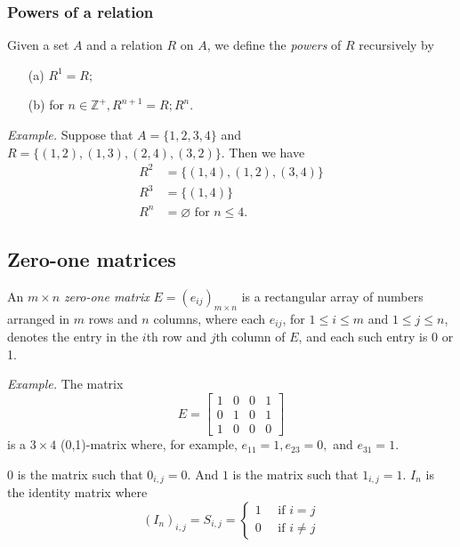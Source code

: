 \documentclass[11pt]{article}
\let\emptyset\varnothing
\begin{document}
    \subsubsection{Powers of a relation}

    Given a set $A$ and a relation $R$ on $A$, we define the \emph{powers} of $R$ recursively by 
    \begin{enumerate}
        \item[(a)] \(R^1 = R;\)
        \item[(b)] for \(n \in \mathbb{Z}^+, R^{n+1} = R;R^n.\)  
    \end{enumerate}

    \emph{Example.} Suppose that \(A = \{1,2,3,4\}\) and \(R = \{(1,2),(1,3),(2,4),(3,2)\}\). Then we have
    \begin{align*}
        R^2 &= \{(1,4),(1,2),(3,4)\} \\
        R^3 &= \{(1,4)\} \\
        R^n &= \emptyset \text{ for } n \leq 4.
    \end{align*}

    \subsection{Zero-one matrices}

    An \(m \times n\) \emph{zero-one matrix} \(E = (e_{ij})_{m \times n}\) is a rectangular array of numbers arranged in $m$ rows and $n$ columns, where each \(e_{ij}\), for \(1 \leq i \leq m\) and \(1 \leq j \leq n\), denotes the entry in the $i$th row and $j$th column of $E$, and each such entry is 0 or 1. 
    
    \vspace{1em}

    \emph{Example.} The matrix 
    \begin{equation*}
        E = \begin{bmatrix}
            1 & 0 & 0 & 1 \\
            0 & 1 & 0 & 1 \\
            1 & 0 & 0 & 0
        \end{bmatrix}
    \end{equation*}
    is a \(3 \times 4\) (0,1)-matrix where, for example, \(e_{11} = 1, e_{23} = 0,\) and \(e_{31} = 1.\)

    \vspace{1em}

    \(0\) is the matrix such that \(0_{i,j} = 0.\) And \(1\) is the matrix such that \(1_{i,j} = 1.\) \(I_n\) is the identity matrix where 
    \begin{equation*}
        (I_n)_{i,j} = S_{i,j} = \begin{cases}
            1 \quad \text{ if } i = j \\ 0 \quad \text{ if } i \neq j
        \end{cases}
    \end{equation*}
\end{document}
